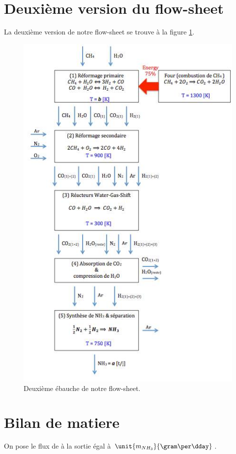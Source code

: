 \documentclass{article}
\begin{document}
	\section{Deuxième version du flow-sheet}
	La deuxième version de notre flow-sheet se trouve à la figure \ref{flow-sheet-v2}.
	
	\begin{figure}[htb!]
	\centering
	\includegraphics[scale=0.80]{flow-sheet-v2.jpg}
	\caption{Deuxième ébauche de notre flow-sheet.}
	\label{flow-sheet-v2}
	\end{figure}

\section{Bilan de matiere}
On pose le flux de  à la sortie égal à $\unit{m_{NH_3}}{\gram\per\dday}$. 
\end{document}
